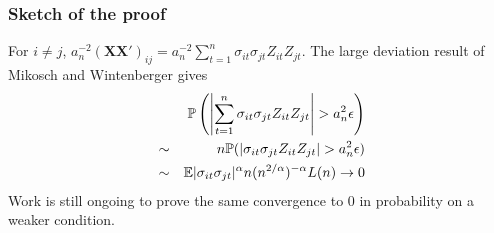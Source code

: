 \documentclass{beamer}
\renewcommand{\P}{
\mathbb P
}
\begin{document}
\begin{frame}
  \frametitle{Sketch of the proof}
  For $i \neq j$, $    a_n^{-2} (\mathbf{XX'})_{ij} = a_n^{-2} \sum_{t=1}^n
  \sigma_{it} \sigma_{jt} Z_{it} Z_{jt}$. The large deviation result
  of Mikosch and Wintenberger gives
  \begin{eqnarray*}
    && \P\left(
      \left|\sum_{t=1}^n \sigma_{it} \sigma_{jt} Z_{it} Z_{jt}\right| > a_n^2 \epsilon
    \right) \\
    &\sim& n \P(|\sigma_{it} \sigma_{jt} Z_{it} Z_{jt}| > a_n^2
    \epsilon) \\
    &\sim& \E |\sigma_{it} \sigma_{jt}|^\alpha n
    (n^{2/\alpha})^{-\alpha} L(n) \to 0
  \end{eqnarray*}
Work is still ongoing to prove the same
convergence to 0 in probability on a weaker condition.
\end{frame}


\end{document}
